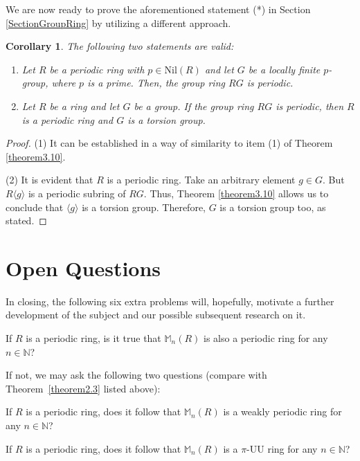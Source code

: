 \documentclass[12pt]{amsart}
\newtheorem{cor}[thm]{Corollary}
\theoremstyle{definition}
\theoremstyle{remark}
\numberwithin{equation}{section}
\begin{document}
We are now ready to prove the aforementioned statement (*) in Section \ref{SectionGroupRing} by utilizing a different approach.

\begin{cor}\label{corollary3.11}
The following two statements are valid:
\begin{enumerate}
\item[\rm{(1)}]
Let $R$ be a periodic ring with $p \in \mathrm{Nil}(R)$ and let $G$ be a locally finite $p$-group, where $p$ is a prime. Then, the group ring $RG$ is periodic.
\item[\rm{(2)}]
Let $R$ be a ring and let $G$ be a group. If the group ring $RG$ is periodic, then $R$ is a periodic ring and $G$ is a torsion group.
\end{enumerate}
\end{cor}

\begin{proof}
(1) It can be established in a way of similarity to item (1) of Theorem \ref{theorem3.10}.

(2) It is evident that $R$ is a periodic ring. Take an arbitrary element $g \in G$. But $R\langle g \rangle$ is a periodic subring of $RG$. Thus, Theorem \ref{theorem3.10} allows us to conclude that $\langle g \rangle$ is a torsion group. Therefore, $G$ is a torsion group too, as stated.
\end{proof}

\section{Open Questions}

In closing, the following six extra problems will, hopefully, motivate a further development of the subject and our possible subsequent research on it.

\medskip

 If $R$ is a periodic ring, is it true that $\mathbb{M}_n(R)$ is also a periodic ring for any $n\in \mathbb{N}$?

\medskip

If not, we may ask the following two questions (compare with Theorem~\ref{theorem2.3} listed above):

\medskip

 If $R$ is a periodic ring, does it follow that $\mathbb{M}_n(R)$ is a weakly periodic ring for any $n\in \mathbb{N}$?

\medskip

 If $R$ is a periodic ring, does it follow that $\mathbb{M}_n(R)$ is a $\pi$-UU ring for any $n\in \mathbb{N}$?
\end{document}
